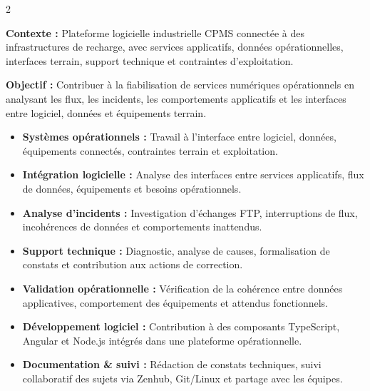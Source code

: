 \documentclass[8pt,a4paper,ragged2e,withhyper]{altacv}
\begin{document}



\makecvheader
\vspace{-0.3cm}


\begin{paracol}{2}



\textbf{Contexte :} Plateforme logicielle industrielle CPMS connectée à des infrastructures de recharge, avec services applicatifs, données opérationnelles, interfaces terrain, support technique et contraintes d’exploitation.

\textbf{Objectif :} Contribuer à la fiabilisation de services numériques opérationnels en analysant les flux, les incidents, les comportements applicatifs et les interfaces entre logiciel, données et équipements terrain.

\begin{itemize}
  \item \textbf{Systèmes opérationnels :} Travail à l’interface entre logiciel, données, équipements connectés, contraintes terrain et exploitation.
  \item \textbf{Intégration logicielle :} Analyse des interfaces entre services applicatifs, flux de données, équipements et besoins opérationnels.
  \item \textbf{Analyse d’incidents :} Investigation d’échanges FTP, interruptions de flux, incohérences de données et comportements inattendus.
  \item \textbf{Support technique :} Diagnostic, analyse de causes, formalisation de constats et contribution aux actions de correction.
  \item \textbf{Validation opérationnelle :} Vérification de la cohérence entre données applicatives, comportement des équipements et attendus fonctionnels.
  \item \textbf{Développement logiciel :} Contribution à des composants TypeScript, Angular et Node.js intégrés dans une plateforme opérationnelle.
  \item \textbf{Documentation \& suivi :} Rédaction de constats techniques, suivi collaboratif des sujets via Zenhub, Git/Linux et partage avec les équipes.
\end{itemize}


\end{paracol}
\end{document}
